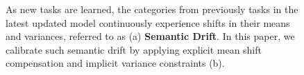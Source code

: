\begin{figure}[!htb]
\centering
{}
\vspace{-5mm}
\caption{\small As new tasks are learned, the categories from previously tasks in the latest updated model continuously experience shifts in their means and variances, referred to as (a) \textbf{Semantic Drift}. In this paper, we calibrate such semantic drift by applying explicit mean shift compensation and implicit variance constraints (b).}
\vspace{-5mm}
\label{fig:teaser}
\end{figure}